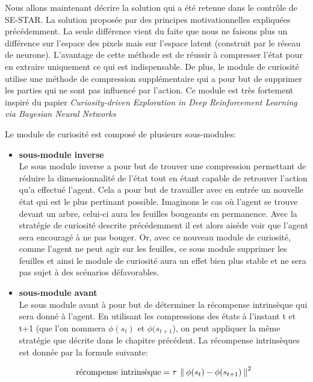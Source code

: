 Nous allons maintenant décrire la solution qui a été retenue dans le contrôle de SE-STAR. La solution proposée par des principes motivationnelles expliquées précédemment. La seule différence vient du faite que nous ne faisons plus un différence sur l'espace des pixels mais sur l'espace latent (construit par le réseau de neurone). L'avantage de cette méthode est de réussir à compresser l'état pour en extraire uniquement ce qui est indispensable. De plus, le module de curiosité utilise une méthode de compression supplémentaire qui a pour but de supprimer les parties qui ne sont pas influencé par l'action. Ce module est très fortement inspiré du papier \emph{Curiosity-driven Exploration in Deep Reinforcement Learning via Bayesian Neural Networks}\cite{curiositydriven}


Le module de curiosité est composé de plusieurs sous-modules:

\begin{itemize}
    \item \textbf{sous-module inverse}\\
        Le sous module inverse a pour but de trouver une compression permettant de réduire la dimensionnalité de l'état tout en étant capable de retrouver l'action qu'a effectué l'agent. Cela a pour but de travailler avec en entrée un nouvelle état qui est le plus pertinant possible. Imaginons le cas où l'agent se trouve devant un arbre, celui-ci aura les feuilles bougeants en permanence. Avec la stratégie de curiosité descrite précédemment il est alors aiséde voir que l'agent sera encouragé à ne pas bouger. Or, avec ce nouveau module de curiosité, comme l'agent ne peut agir sur les feuilles, ce sous module supprimer les feuilles et ainsi le module de curiosité aura un effet bien plus stable et ne sera pas sujet à des scénarios défavorables.
    \item \textbf{sous-module avant}\\
        Le sous module avant à pour but de déterminer la récompense intrinsèque qui sera donné à l'agent.
        En utilisant les compressions des états à l'instant t et t+1 (que l'on nommera $\phi(s_t)$ et $\phi(s_{t+1}$), on peut appliquer la même stratégie que décrite dans le chapitre précédent. La récompense intrinsèques est donnée par la formule suivante:

\begin{equation}\label{eqn:hierarchicalcuriosity}
    \text{récompense intrinsèque} = \tau\: \left\lVert\:  \phi(s_t) - \phi(s_{t+1})  \:\right\rVert^2 
\end{equation}

\end{itemize}

